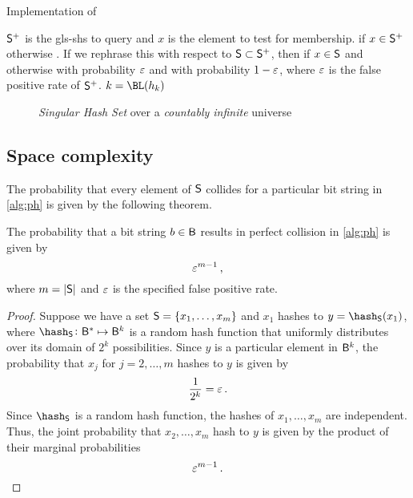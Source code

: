 \documentclass[ ../main.tex]{subfiles}
\begin{document}
\begin{algorithm}
    \caption{Implementation of \protect\Contains}
    \label{alg:contains}
    \DontPrintSemicolon
    \KwIn
    {
        $\PASet{S}$ is the \gls{gls-shs} to query and $x$ is the element to test for membership.
    }
    \KwOut
    {
        \True if $x \in \PASet{S}$ otherwise \False. If we rephrase this with respect to $\Set{S} \subset \PASet{S}$, then \True if $x \in \Set{S}$ and otherwise \True with probability $\varepsilon$ and \False with probability $1 - \varepsilon$, where $\varepsilon$ is the false positive rate of $\PASet{S}$.
    }
    {
        $k = \BL(h_k)$\;
        {
            \Return \True\;
        }
        \uElse
        {
            \Return \False\;
        }
    }
\end{algorithm}

\begin{figure}
    \centering
    
    \caption{\emph{Singular Hash Set} over a \emph{countably infinite} universe}
    \label{fig:my_label}
\end{figure}

\subsection{Space complexity}
The probability that every element of $\Set{S}$ collides for a particular bit string in \cref{alg:ph} is given by the following theorem.
\begin{theorem}
The probability that a bit string $b \in \Set{B}$ results in perfect collision in \cref{alg:ph} is given by
\begin{equation}
\label{eq:p_m_N}
    \varepsilon^{m-1}\,,
\end{equation}
where $m = \Card{\Set{S}}$ and $\varepsilon$ is the specified false positive rate.
\end{theorem}
\begin{proof}
Suppose we have a set $\Set{S} = \{x_1,\ldots,x_m\}$ and $x_1$ hashes to $y = \hash_{\Set{S}}(x_1)$, where $\hash_{\Set{S}} \colon \Set{B}^{*} \mapsto \Set{B}^k$ is a random hash function that uniformly distributes over its domain of $2^k$ possibilities. Since $y$ is a particular element in $\Set{B}^k$, the probability that $x_j$ for $j=2,\ldots,m$ hashes to $y$ is given by
\begin{equation}
    \frac{1}{2^k} = \varepsilon\,.
\end{equation}
Since $\hash_{\Set{S}}$ is a random hash function, the hashes of $x_1,\ldots,x_m$ are independent. Thus, the joint probability that $x_2, \ldots, x_m$ hash to $y$ is given by the product of their marginal probabilities
\begin{equation}
    \varepsilon^{m-1}\,.
\end{equation}
\end{proof}
\end{document}

